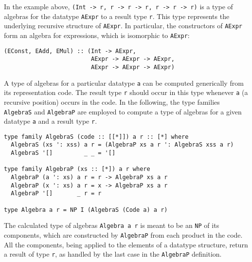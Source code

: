 \documentclass[runningheads]{llncs}
\newcommand{\K}[1]{\lstinline[style=fancy]{#1}}
\begin{document}
In the example above, \K{(Int -> r, r -> r -> r, r -> r -> r)} is a type of algebras for the datatype \K{AExpr} to a result type \K{r}. This type represents the underlying recursive structure of \K{AExpr}. In particular, the constructors of \K{AExpr} form an algebra for expressions, which is isomorphic to \K{AExpr}:
\begin{lstlisting}[style=fancy]
(EConst, EAdd, EMul) :: (Int -> AExpr,
                         AExpr -> AExpr -> AExpr,
                         AExpr -> AExpr -> AExpr)
\end{lstlisting}
A type of algebras for a particular datatype \K{a} can be computed generically from its representation code. The result type \K{r} should occur in this type whenever \K{a} (a recursive position) occurs in the code. In the following, the type families \K{AlgebraS} and \K{AlgebraP} are employed to compute a type of algebras for a given datatype \K{a} and a result type \K{r}.
\begin{lstlisting}[style=fancy]
type family AlgebraS (code :: [[*]]) a r :: [*] where
  AlgebraS (xs ': xss) a r = (AlgebraP xs a r ': AlgebraS xss a r)
  AlgebraS '[]         _ _ = '[]

type family AlgebraP (xs :: [*]) a r where
  AlgebraP (a ': xs) a r = r -> AlgebraP xs a r
  AlgebraP (x ': xs) a r = x -> AlgebraP xs a r
  AlgebraP '[]       _ r = r

type Algebra a r = NP I (AlgebraS (Code a) a r)
\end{lstlisting}
The calculated type of algebras \K{Algebra a r} is meant to be an \K{NP} of its components, which are constructed by \K{AlgebraP} from each product in the code. All the components, being applied to the elements of a datatype structure, return a result of type \K{r}, as handled by the last case in the \K{AlgebraP} definition.
\end{document}
